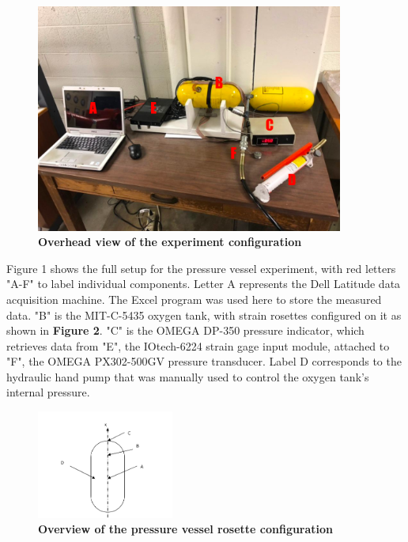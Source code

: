 \documentclass[12pt]{article}
\begin{document}
\begin{figure} [H]
	\centering
	\includegraphics[width=0.9\textwidth]{setup}
	\caption{\textbf{Overhead view of the experiment configuration}}
\end{figure}
Figure 1 shows the full setup for the pressure vessel experiment, with red letters "A-F" to 
label individual components. Letter A represents the Dell Latitude data acquisition machine. The
Excel program was used here to store the measured data. "B" is the MIT-C-5435 oxygen tank, with 
strain rosettes configured on it as shown in \textbf{Figure 2}. "C" is the OMEGA DP-350 pressure
indicator, which retrieves data from "E", the IOtech-6224 strain gage input module, attached to
"F", the OMEGA PX302-500GV pressure transducer. Label D corresponds to the hydraulic hand pump 
that was manually used to control the oxygen tank's internal pressure. 

\begin{figure} [H]
	\centering
	\includegraphics [width=0.4\textwidth]{vessel}
	\caption{\textbf{Overview of the pressure vessel rosette configuration}}
\end{figure} 
\end{document}
